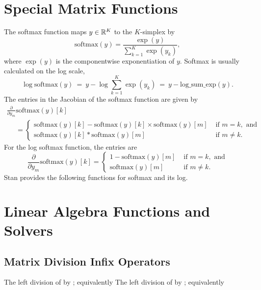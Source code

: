 \section{Special Matrix Functions}\label{softmax.section}

The softmax function maps $y \in \reals^K$ to the $K$-simplex by
\[
\mbox{softmax}(y)
 = \frac{\exp(y)}
        {\sum_{k=1}^K \exp(y_k)},
\]
%
where $\exp(y)$ is the componentwise exponentiation of $y$.
%
Softmax is usually calculated on the log scale, 
\[
\log \mbox{softmax}(y)
 \ = \ y - \log \sum_{k=1}^K \exp(y_k)
 \ = \ y - \mbox{log\_sum\_exp}(y).
\]
%
The entries in the Jacobian of the softmax function are given by
\[
\begin{array}{l}
\displaystyle
\frac{\partial}{\partial y_m} \mbox{softmax}(y)[k]
\\[8pt]
\displaystyle
\mbox{ } \ \ \ = \left\{ 
\begin{array}{ll}
\mbox{softmax}(y)[k] - \mbox{softmax}(y)[k] \times \mbox{softmax}(y)[m]
& \mbox{ if } m = k, \mbox{ and}
\\[6pt]
\mbox{softmax}(y)[k] * \mbox{softmax}(y)[m]
& \mbox{ if } m \neq k.
\end{array}
\right.
\end{array}
\]
For the log softmax function, the entries are
\[
\frac{\partial}{\partial y_m} \mbox{softmax}(y)[k]
= \left\{ 
\begin{array}{ll}
1 - \mbox{softmax}(y)[m]
& \mbox{ if } m = k, \mbox{ and}
\\[6pt]
\mbox{softmax}(y)[m]
& \mbox{ if } m \neq k.
\end{array}
\right.
\]
%
Stan provides the following functions for softmax and its log.
%
\begin{description}
%
\end{description}
%



\section{Linear Algebra Functions and Solvers}

\subsection{Matrix Division Infix Operators}
%
\begin{description}
%
%
%
The left division of  by ; equivalently
%
The left division of  by ; equivalently
%
\end{description}

